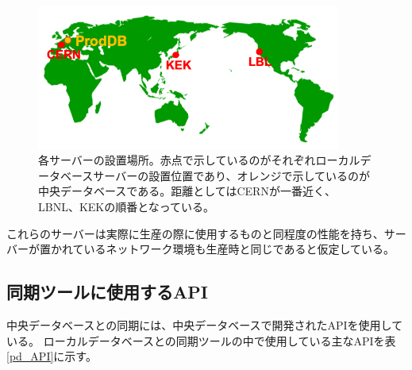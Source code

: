 \begin{figure}[bpt]\centering
\includegraphics[width=10cm]{./server_geometry.png}
\caption[各サーバーの設置場所]{各サーバーの設置場所。赤点で示しているのがそれぞれローカルデータベースサーバーの設置位置であり、オレンジで示しているのが中央データベースである。距離としてはCERNが一番近く、LBNL、KEKの順番となっている。}
\label{server_geometry}
\end{figure}

これらのサーバーは実際に生産の際に使用するものと同程度の性能を持ち、サーバーが置かれているネットワーク環境も生産時と同じであると仮定している。

\subsection{同期ツールに使用するAPI}
中央データベースとの同期には、中央データベースで開発されたAPIを使用している。
ローカルデータベースとの同期ツールの中で使用している主なAPIを表\ref{pd_API}に示す。

\begin{table}[tbp]
  \begin{center}
  \caption[同期ツールの中で使用する中央データベースの主なAPI一覧]{同期ツールの中で使用する中央データベースの主なAPI一覧。同期ツールにおいて、中央データベースの情報取得には提供されているいくつかのAPIを用いており代表的なものを示す。このAPIをPythonを用いて実行することで、情報取得や試験結果のアップロードをすることができる。}
  \label{pd_API}
  \end{center}
\end{table}

